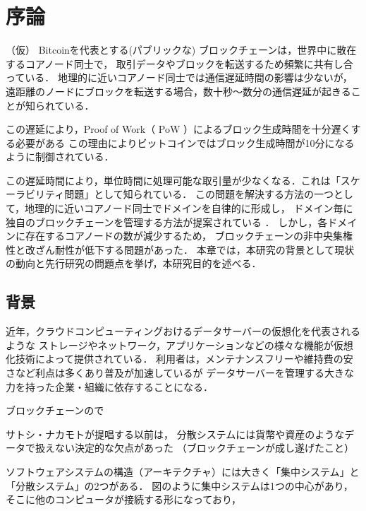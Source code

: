 \documentclass[a4paper,12pt]{jsarticle}
\begin{document}

\section{序論}

（仮）
Bitcoinを代表とする(パブリックな) ブロックチェーンは，世界中に散在するコアノード同士で，
取引データやブロックを転送するため頻繁に共有し合っている．
地理的に近いコアノード同士では通信遅延時間の影響は少ないが，
遠距離のノードにブロックを転送する場合，数十秒〜数分の通信遅延が起きることが知られている．

この遅延により，Proof of Work（ PoW ）によるブロック生成時間を十分遅くする必要がある
この理由によりビットコインではブロック生成時間が10分になるように制御されている．

この遅延時間により，単位時間に処理可能な取引量が少なくなる．これは「スケーラビリティ問題」として知られている． 
この問題を解決する方法の一つとして，地理的に近いコアノード同士でドメインを自律的に形成し，
ドメイン毎に独自のブロックチェーンを管理する方法が提案されている \cite{fujihara1}\cite{fujihara2}．
しかし，各ドメインに存在するコアノードの数が減少するため，
ブロックチェーンの非中央集権性と改ざん耐性が低下する問題があった．
本章では，本研究の背景として現状の動向と先行研究の問題点を挙げ，本研究目的を述べる．


\subsection{背景}
近年，クラウドコンピューティングおけるデータサーバーの仮想化を代表されるような
ストレージやネットワーク，アプリケーションなどの様々な機能が仮想化技術によって提供されている．
利用者は，メンテナンスフリーや維持費の安さなど利点は多くあり普及が加速しているが
データサーバーを管理する大きな力を持った企業・組織に依存することになる．

ブロックチェーンので

サトシ・ナカモトが提唱する以前は，
分散システムには貨幣や資産のようなデータで扱えない決定的な欠点があった
（ブロックチェーンが成し遂げたこと）


ソフトウェアシステムの構造（アーキテクチャ）には大きく「集中システム」と「分散システム」の2つがある．
図のように集中システムは1つの中心があり，そこに他のコンピュータが接続する形になっており，
\end{document}
